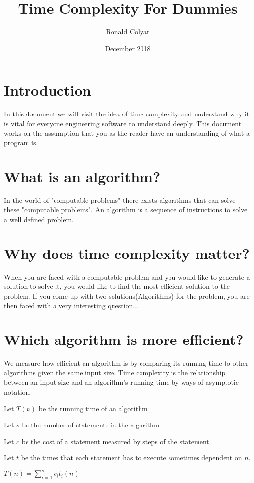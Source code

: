 \documentclass{article}
\title{Time Complexity For Dummies}
\author{Ronald Colyar}
\date{December 2018}
\begin{document}
\maketitle

\section*{Introduction}
In this document we will visit the idea of time complexity and understand why it is vital for everyone engineering software to understand deeply. This document works on the assumption that you as the reader have an understanding of what a program is.
\section*{What is an algorithm?}
In the world of "computable problems"  there exists algorithms
that can solve these "computable problems". An algorithm is a sequence of instructions to solve a well defined problem. 

\section*{Why does time complexity matter?}
When you are faced with a computable problem and you would like to generate a solution to solve it, you would like to find the most efficient solution to the problem. If you come up with two solutions(Algorithms) for the problem, you are then faced with a very interesting question...

\section*{Which algorithm is more efficient?}
We measure how efficient an algorithm is by comparing its running time to other algorithms given the same input size. Time complexity is the relationship between an input size and an algorithm's running time by ways of asymptotic notation.

Let $T(n)$ be the running time of an algorithm 

Let $s$ be the number of statements in the algorithm

Let $c$ be the cost of a statement measured by steps of the statement.

Let $t$ be the times that each statement has to execute sometimes dependent on $n$.

$T(n) = \sum_{i=1}^{s}c_it_i(n)$
\end{document}
